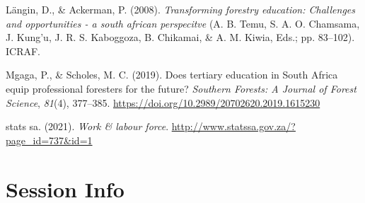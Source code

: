 \documentclass[
  11pt,
]{article}
\newlength{\cslhangindent}
\newenvironment{CSLReferences}[2] %
 {%
  \setlength{\parindent}{0pt}
  \ifodd #1 \everypar{\setlength{\hangindent}{\cslhangindent}}\ignorespaces\fi
  \ifnum #2 > 0
  \setlength{\parskip}{#2\baselineskip}
  \fi
 }%
 {}
\begin{document}
\hypertarget{refs}{}
\begin{CSLReferences}{1}{0}
\leavevmode{}%
Längin, D., \& Ackerman, P. (2008). \emph{Transforming forestry
education: Challenges and opportunities - a south african perspecitve}
(A. B. Temu, S. A. O. Chamsama, J. Kung'u, J. R. S. Kaboggoza, B.
Chikamai, \& A. M. Kiwia, Eds.; pp. 83--102). ICRAF.

\leavevmode{}%
Mgaga, P., \& Scholes, M. C. (2019). Does tertiary education in {South
Africa} equip professional foresters for the future? \emph{Southern
Forests: A Journal of Forest Science}, \emph{81}(4), 377--385.
\url{https://doi.org/10.2989/20702620.2019.1615230}

\leavevmode{}%
stats sa. (2021). \emph{Work \& labour force}.
\url{http://www.statssa.gov.za/?page_id=737\&id=1}

\end{CSLReferences}

\clearpage

\clearpage

\hypertarget{session-info}{%
\section*{Session Info}\label{session-info}}
\end{document}
